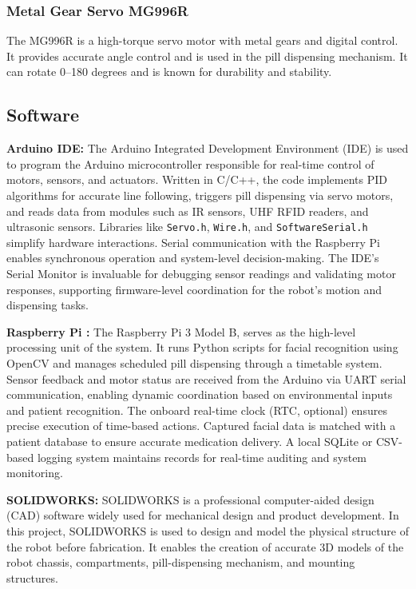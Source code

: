 \subsubsection{Metal Gear Servo MG996R}
The MG996R is a high-torque servo motor with metal gears and digital control. It provides accurate angle control and is used in the pill dispensing mechanism. It can rotate 0–180 degrees and is known for durability and stability.

\subsection{Software}

\textbf{Arduino IDE:} The Arduino Integrated Development Environment (IDE) is used to program the Arduino microcontroller responsible for real-time control of motors, sensors, and actuators. Written in C/C++, the code implements PID algorithms for accurate line following, triggers pill dispensing via servo motors, and reads data from modules such as IR sensors, UHF RFID readers, and ultrasonic sensors. Libraries like \texttt{Servo.h}, \texttt{Wire.h}, and \texttt{SoftwareSerial.h} simplify hardware interactions. Serial communication with the Raspberry Pi enables synchronous operation and system-level decision-making. The IDE’s Serial Monitor is invaluable for debugging sensor readings and validating motor responses, supporting firmware-level coordination for the robot’s motion and dispensing tasks.

\vspace{0.5em}

\textbf{Raspberry Pi :} The Raspberry Pi 3 Model B, serves as the high-level processing unit of the system. It runs Python scripts for facial recognition using OpenCV and manages scheduled pill dispensing through a timetable system. Sensor feedback and motor status are received from the Arduino via UART serial communication, enabling dynamic coordination based on environmental inputs and patient recognition. The onboard real-time clock (RTC, optional) ensures precise execution of time-based actions. Captured facial data is matched with a patient database to ensure accurate medication delivery. A local SQLite or CSV-based logging system maintains records for real-time auditing and system monitoring.

\vspace{0.5em}

\textbf{SOLIDWORKS:} SOLIDWORKS is a professional computer-aided design (CAD) software widely used for mechanical design and product development. In this project, SOLIDWORKS is used to design and model the physical structure of the robot before fabrication. It enables the creation of accurate 3D models of the robot chassis, compartments, pill-dispensing mechanism, and mounting structures.






